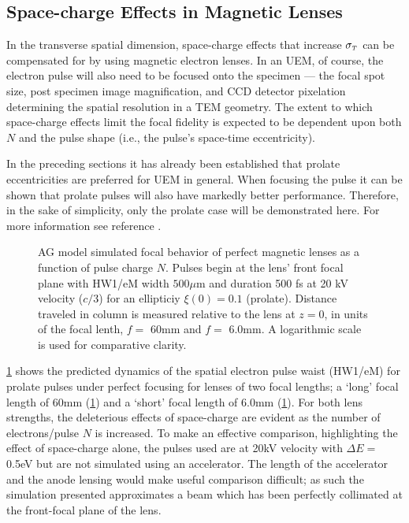 \subsection{Space-charge Effects in Magnetic Lenses}

In the transverse spatial dimension, space-charge effects that increase $ \sigma_{ {\scriptscriptstyle T} } $ can be compensated for by using magnetic electron lenses.\cite{oudheusden_electron_2007,lagrange_nanosecond_2008}
In an UEM, of course, the electron pulse will also need to be focused onto the specimen --- the focal spot size, post specimen image magnification, and CCD detector pixelation determining the spatial resolution in a TEM geometry.\cite{berger_dc_2009}
The extent to which space-charge effects limit the focal fidelity is expected to be dependent upon both $N$ and the pulse shape (i.e., the pulse's space-time eccentricity).

In the preceding sections it has already been established that prolate eccentricities are preferred for UEM in general.
When focusing the pulse it can be shown that prolate pulses will also have markedly better performance.
Therefore, in the sake of simplicity, only the prolate case will be demonstrated here.
For more information see reference \cite{berger_semi-analytic_2010}.

\begin{figure}
  \centering
  \centerline{
    \subfloat[][] {
      \label{fig:focus_lens_charge_long}
      
    }
    \subfloat[][] { 
      \label{fig:focus_lens_charge_short}
      
    }
  }
  \caption[AG model simulated focal behavior of perfect magnetic lenses as a function of pulse charge $N$]{
    AG model simulated focal behavior of perfect magnetic lenses as a function of pulse charge $N$.
    Pulses begin at the lens' front focal plane with HW1/eM width $ 500 \mu \text{m}$ and duration 500 fs at 20 kV velocity ($c/3$) for an ellipticiy $ \xi ( 0 ) = 0.1 $ (prolate).
    Distance traveled in column is measured relative to the lens at $z=0$, in units of the focal lenth,  $f = $ 60mm and  $ f = $ 6.0mm.
    A logarithmic scale is used for comparative clarity.
  }
  \label{fig:focus_lens_charge}
\end{figure}

\ref{fig:focus_lens_charge} shows the predicted dynamics of the spatial electron pulse waist (HW1/eM) for prolate pulses under perfect focusing for lenses of two focal lengths; a `long' focal length of 60mm (\ref{fig:focus_lens_charge}) and a `short' focal length of 6.0mm (\ref{fig:focus_lens_charge}).
For both lens strengths, the deleterious effects of space-charge are evident as the number of electrons/pulse $ N $ is increased.
To make an effective comparison, highlighting the effect of space-charge alone, the pulses used are at 20kV velocity with $\Delta E = $ 0.5eV but are not simulated using an accelerator.
The length of the accelerator and the anode lensing would make useful comparison difficult; as such the simulation presented approximates a beam which has been perfectly collimated at the front-focal plane of the lens.

